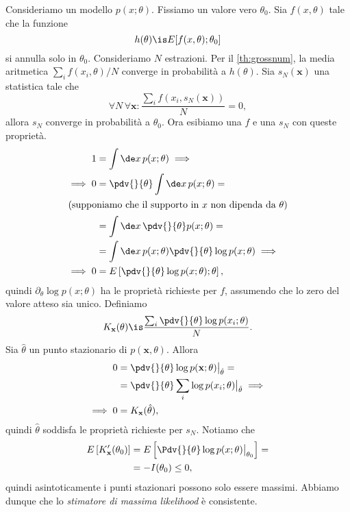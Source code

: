Consideriamo un modello $p(x;\theta)$.
Fissiamo un valore vero $\theta_0$.
Sia $f(x,\theta)$ tale che la funzione
\begin{equation*}
	h(\theta)\is E[f(x,\theta);\theta_0]
\end{equation*}
si annulla solo in $\theta_0$.
Consideriamo $N$ estrazioni.
Per il \autoref{th:grossnum},
la media aritmetica $\sum_i f(x_i,\theta)/N$ converge in probabilità a $h(\theta)$.
Sia $s_N(\mathbf x)$ una statistica tale che
\begin{equation*}
	\forall N \,\forall\mathbf x: \frac{\sum_i f(x_i,s_N(\mathbf x))}N = 0,
\end{equation*}
allora $s_N$ converge in probabilità a $\theta_0$.
%
Ora esibiamo una $f$ e una $s_N$ con queste proprietà.
\begin{align*}
	1
	&= \int\de x\, p(x;\theta) \implies \\
	\implies 0
	&= \pdv{}{\theta} \int\de x\, p(x;\theta) = \\
	\intertext{(supponiamo che il supporto in $x$ non dipenda da $\theta$)}
	&= \int\de x\, \pdv{}{\theta} p(x;\theta) = \\
	&= \int\de x\, p(x;\theta) \pdv{}{\theta} \log p(x;\theta) \implies \\
	\implies 0
	&= E \left[ \pdv{}{\theta} \log p(x;\theta);\theta \right],
\end{align*}
quindi $\partial_\theta \log p(x;\theta)$ ha le proprietà richieste per $f$,
assumendo che lo zero del valore atteso sia unico.
Definiamo
\begin{equation*}
	K_{\mathbf x}(\theta)
	\is \frac{\sum_i \pdv{}{\theta} \log p(x_i;\theta)} N.
\end{equation*}
Sia $\hat\theta$ un punto stazionario di $p(\mathbf x,\theta)$.
Allora
\begin{align*}
	0
	&= \pdv{}{\theta} \log p(\mathbf x;\theta) \big|_{\hat\theta} = \\
	&= \pdv{}{\theta} \sum_i \log p(x_i;\theta) \big|_{\hat\theta} \implies \\
	\implies 0
	&= K_{\mathbf x}(\hat\theta),
\end{align*}
quindi $\hat\theta$ soddisfa le proprietà richieste per $s_N$.
Notiamo che
\begin{align*}
	E \left[ K_{\mathbf x}'(\theta_0) \right]
	&= E \left[ \Pdv{}{\theta} \log p(x;\theta) \big|_{\theta_0} \right] = \\
	&= -I(\theta_0)
	\le 0,
\end{align*}
quindi asintoticamente i punti stazionari possono solo essere massimi.
Abbiamo dunque che lo \emph{stimatore di massima likelihood} è consistente.

